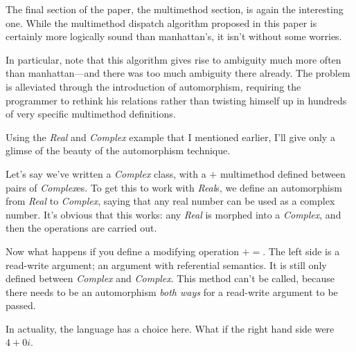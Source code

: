\documentclass[12pt]{article}
\begin{document}
The final section of the paper, the multimethod section, is again the
interesting one.  While the multimethod dispatch algorithm proposed in
this paper is certainly more logically sound than manhattan's, it isn't
without some worries.

In particular, note that this algorithm gives rise to ambiguity much
more often than manhattan---and there was too much ambiguity there
already.  The problem is alleviated through the introduction of
automorphism, requiring the programmer to rethink his relations rather
than twisting himself up in hundreds of very specific multimethod
definitions. 

Using the \textit{Real} and \textit{Complex} example that I mentioned
earlier, I'll give only a glimse of the beauty of the automorphism
technique.

Let's say we've written a \textit{Complex} class, with a $+$ multimethod
defined between pairs of \textit{Complex}es.  To get this to work with
\textit{Real}s, we define an automorphism from \textit{Real} to
\textit{Complex}, saying that any real number can be used as a complex
number.  It's obvious that this works:  any \textit{Real} is morphed
into a \textit{Complex}, and then the operations are carried out.

Now what happens if you define a modifying operation $+=$.  The left
side is a read-write argument; an argument with referential semantics.
It is still only defined between \textit{Complex} and \textit{Complex}.
This method can't be called, because there needs to be an automorphism
\textit{both ways} for a read-write argument to be passed.

In actuality, the language has a choice here.  What if the right hand
side were $4 + 0i$.  
\end{document}
